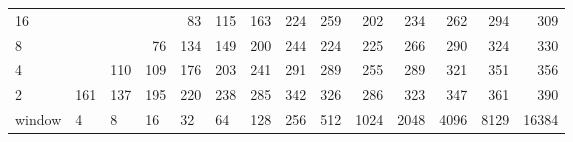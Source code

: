 \begin{table}[h]
\begin{tabular}{lrrrrrrrrrrrrr}
		\multicolumn{1}{|l|}{16} &  &  &  & \cellcolor[HTML]{99E600}83 & \cellcolor[HTML]{99E600}115 & \cellcolor[HTML]{E69900}163 & \cellcolor[HTML]{E60000}224 & \cellcolor[HTML]{9900E6}259 & \cellcolor[HTML]{E60000}202 & \cellcolor[HTML]{E60000}234 & \cellcolor[HTML]{9900E6}262 & \cellcolor[HTML]{9900E6}294 & \cellcolor[HTML]{9900E6}309 \\ \cline{1-1}
		\multicolumn{1}{|l|}{8} &  &  & \cellcolor[HTML]{99E600}76 & \cellcolor[HTML]{E69900}134 & \cellcolor[HTML]{E69900}149 & \cellcolor[HTML]{E60000}200 & \cellcolor[HTML]{E60000}244 & \cellcolor[HTML]{E60000}224 & \cellcolor[HTML]{E60000}225 & \cellcolor[HTML]{9900E6}266 & \cellcolor[HTML]{9900E6}290 & \cellcolor[HTML]{9900E6}324 & \cellcolor[HTML]{9900E6}330 \\ \cline{1-1}
		\multicolumn{1}{|l|}{4} &  & \cellcolor[HTML]{99E600}110 & \cellcolor[HTML]{99E600}109 & \cellcolor[HTML]{E69900}176 & \cellcolor[HTML]{E60000}203 & \cellcolor[HTML]{E60000}241 & \cellcolor[HTML]{9900E6}291 & \cellcolor[HTML]{9900E6}289 & \cellcolor[HTML]{9900E6}255 & \cellcolor[HTML]{9900E6}289 & \cellcolor[HTML]{9900E6}321 & \cellcolor[HTML]{4C00E6}351 & \cellcolor[HTML]{4C00E6}356 \\ \cline{1-1}
		\multicolumn{1}{|l|}{2} & \cellcolor[HTML]{E69900}161 & \cellcolor[HTML]{E69900}137 & \cellcolor[HTML]{E60000}195 & \cellcolor[HTML]{E60000}220 & \cellcolor[HTML]{E60000}238 & \cellcolor[HTML]{9900E6}285 & \cellcolor[HTML]{9900E6}342 & \cellcolor[HTML]{9900E6}326 & \cellcolor[HTML]{9900E6}286 & \cellcolor[HTML]{9900E6}323 & \cellcolor[HTML]{4C00E6}347 & \cellcolor[HTML]{4C00E6}361 & \cellcolor[HTML]{4C00E6}390 \\ \hline
		\multicolumn{1}{l|}{window} & \multicolumn{1}{l|}{4} & \multicolumn{1}{l|}{8} & \multicolumn{1}{l|}{16} & \multicolumn{1}{l|}{32} & \multicolumn{1}{l|}{64} & \multicolumn{1}{l|}{128} & \multicolumn{1}{l|}{256} & \multicolumn{1}{l|}{512} & \multicolumn{1}{l|}{1024} & \multicolumn{1}{l|}{2048} & \multicolumn{1}{l|}{4096} & \multicolumn{1}{l|}{8129} & \multicolumn{1}{l|}{16384} \\ \cline{2-14} 
	\end{tabular}
\end{table}

